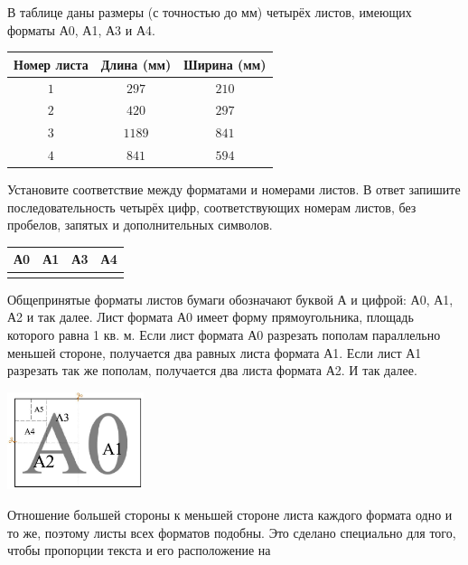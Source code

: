 %
%
%
\begin{class}[number=4]
	\begin{listofex}
		\item В таблице даны размеры (с точностью до мм) четырёх листов, имеющих форматы А0, А1, А3 и А4.
		\begin{center}
			\footnotesize
			\begin{tabular}{|c|c|c|}
				\hline
				\rowcolor{gray}\textbf{Номер листа}&\textbf{Длина (мм)}&\textbf{Ширина (мм)}\\
				\hline
				\( 1 \)&\( 297 \)&\( 210 \)\\
				\hline
				\( 2 \)&\( 420 \)&\( 297 \)\\
				\hline
				\( 3 \)&\( 1189 \)&\( 841 \)\\
				\hline
				\( 4 \)&\( 841 \)&\( 594 \)\\
				\hline
			\end{tabular}
		\end{center}
		Установите соответствие между форматами и номерами листов. В ответ запишите последовательность четырёх цифр, соответствующих номерам листов, без пробелов, запятых и дополнительных символов.
			\begin{center}
			\footnotesize
			\begin{tabular}{|c|c|c|c|}
				\hline
				\rowcolor{gray}А0&А1&А3&А4\\
				\hline
				&&&\\
				\hline
			\end{tabular}
		\end{center}
		Общепринятые форматы листов бумаги обозначают буквой А и цифрой: А0, А1, А2 и так далее. Лист формата А0 имеет форму прямоугольника, площадь которого равна 1 кв. м. Если лист формата А0 разрезать пополам параллельно меньшей стороне, получается два равных листа формата А1. Если лист А1 разрезать так же пополам, получается два листа формата А2. И так далее.
		\begin{center}
			\includegraphics[align=t, width=0.3\textwidth]{pics/G91M3C4-1}
		\end{center}
		Отношение большей стороны к меньшей стороне листа каждого формата одно и то же, поэтому листы всех форматов подобны. Это сделано специально для того, чтобы пропорции текста и его расположение на

\end{listofex}
\end{class}
